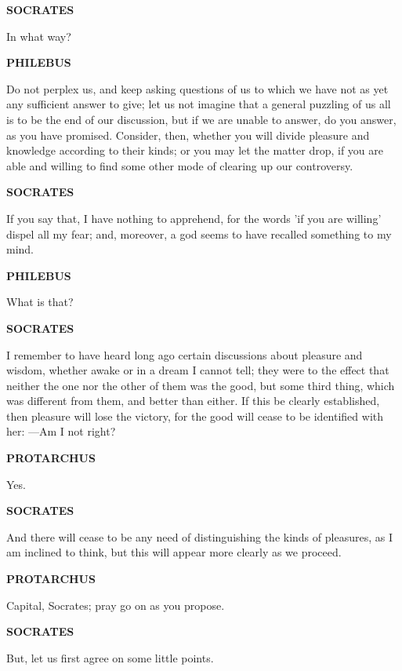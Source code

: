 \documentclass[11pt,letter]{article}
\begin{document}
\par \textbf{SOCRATES}
\par   In what way?

\par \textbf{PHILEBUS}
\par   Do not perplex us, and keep asking questions of us to which we have not as yet any sufficient answer to give; let us not imagine that a general puzzling of us all is to be the end of our discussion, but if we are unable to answer, do you answer, as you have promised. Consider, then, whether you will divide pleasure and knowledge according to their kinds; or you may let the matter drop, if you are able and willing to find some other mode of clearing up our controversy.

\par \textbf{SOCRATES}
\par   If you say that, I have nothing to apprehend, for the words 'if you are willing' dispel all my fear; and, moreover, a god seems to have recalled something to my mind.

\par \textbf{PHILEBUS}
\par   What is that?

\par \textbf{SOCRATES}
\par   I remember to have heard long ago certain discussions about pleasure and wisdom, whether awake or in a dream I cannot tell; they were to the effect that neither the one nor the other of them was the good, but some third thing, which was different from them, and better than either. If this be clearly established, then pleasure will lose the victory, for the good will cease to be identified with her: —Am I not right?

\par \textbf{PROTARCHUS}
\par   Yes.

\par \textbf{SOCRATES}
\par   And there will cease to be any need of distinguishing the kinds of pleasures, as I am inclined to think, but this will appear more clearly as we proceed.

\par \textbf{PROTARCHUS}
\par   Capital, Socrates; pray go on as you propose.

\par \textbf{SOCRATES}
\par   But, let us first agree on some little points.
\end{document}
